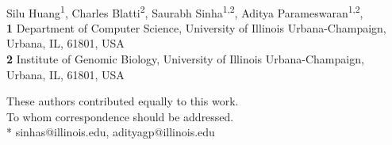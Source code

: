 \documentclass[10pt,letterpaper]{article}
\begin{document}
\vspace*{0.2in}

\begin{flushleft}
{\Large
\textbf{} %
}
\newline
\\
Silu Huang\textsuperscript{1\ddag},
Charles Blatti\textsuperscript{2\ddag},
Saurabh Sinha\textsuperscript{1,2\dag},
Aditya Parameswaran\textsuperscript{1,2\dag},
\\
\bigskip
\textbf{1} Department of Computer Science, University of Illinois Urbana-Champaign, Urbana, IL, 61801, USA
\\
\textbf{2} Institute of Genomic Biology, University of Illinois Urbana-Champaign, Urbana, IL, 61801, USA
\\
\bigskip

% 
%

\ddag These authors contributed equally to this work.
\\
\dag To whom correspondence should be addressed.
\\
* sinhas@illinois.edu, adityagp@illinois.edu







\end{flushleft}
\end{document}
